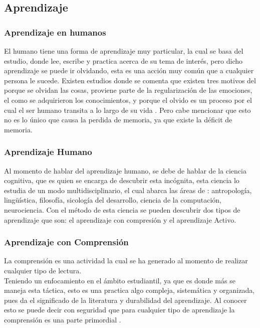 \subsection{Aprendizaje}

    \subsubsection{Aprendizaje en humanos}
    	
    	
        El humano tiene una forma de aprendizaje muy particular, la cual se basa del estudio, donde lee, escribe y practica acerca de
        su tema de interés, pero dicho aprendizaje se puede ir olvidando, esta es una acción muy común que a cualquier persona le sucede.
        Existen estudios donde se comenta que existen tres motivos del porque se olvidan las cosas, proviene parte de la regularización de las emociones,
        el como se adquirieron los conocimientos, y porque el olvido es un proceso por el cual el ser humano transita a lo largo de su vida \cite{Nrby2015}. Pero cabe
        mencionar que esto no es lo único que causa la perdida de memoria, ya que existe la déficit de memoria. 

    \subsubsection{Aprendizaje Humano}
    	
    	
        Al momento de hablar del aprendizaje humano, se debe de hablar de la ciencia cognitiva, que es quien se encarga de descubrir esta incógnita,
        esta ciencia lo estudia de un modo multidisciplinario, el cual abarca las \'areas de \cite{bransford2000}: antropología, lingüística, 
        filosofía, sicología del desarrollo, ciencia de la computación, neurociencia.
        Con el método de esta ciencia se pueden descubrir dos tipos de aprendizaje que son: el aprendizaje con compresi\'on y el aprendizaje Activo.
        
        \subsubsection{Aprendizaje con Comprensi\'on}
        	
        	
            La comprensi\'on es una actividad la cual se ha generado al momento de realizar cualquier tipo de lectura.\\
            
            Teniendo un enfocamiento en el \'ambito estudiantil, ya que es donde m\'as se maneja esta t\'actica, esto es una
            practica algo compleja, sistemática y organizada, pues da el significado de la literatura y durabilidad del aprendizaje.
            Al conocer esto se puede decir con seguridad que para cualquier tipo de aprendizaje la comprensi\'on es 
            una parte primordial \cite{perez2014}.


